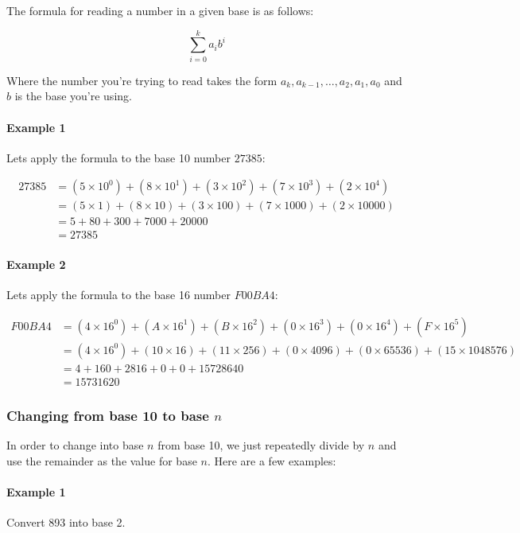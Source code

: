 \documentclass{article}
\begin{document}
The formula for reading a number in a given base is as follows:

\[
	\sum_{i=0}^{k}a_{i}b^{i}
\]

Where the number you're trying to read takes the form $a_k, a_{k-1}, \ldots, a_2, a_1, a_0$ and $b$ is the base you're using.

\paragraph{Example 1}

Lets apply the formula to the base 10 number $27385$:

\[
	\begin{split}
		27385 &= (5 \times 10^0) + (8 \times 10^1) + (3 \times 10^2) + (7 \times 10^3) + (2 \times 10^4)\\
		      &= (5 \times 1) + (8 \times 10) + (3 \times 100) + (7 \times 1000) + (2 \times 10000)\\
		      &= 5 + 80 + 300 + 7000 + 20000\\
		      &= 27385
	\end{split}
\]

\paragraph{Example 2}

Lets apply the formula to the base 16 number $F00BA4$:

\[
	\begin{split}
		F00BA4 &= (4 \times 16^0) + (A \times 16^1) + (B \times 16^2) + (0 \times 16^3) + (0 \times 16^4) + (F \times 16^5)\\
		       &= (4 \times 16^0) + (10 \times 16) + (11 \times 256) + (0 \times 4096) + (0 \times 65536) + (15 \times 1048576)\\
		       &= 4 + 160 + 2816 + 0 + 0 + 15728640\\
		       &= 15731620
	\end{split}
\]

\subsubsection{Changing from base 10 to base $n$}

In order to change into base $n$ from base 10, we just repeatedly divide by $n$ and use the remainder as the value for base $n$. Here are a few examples:

\paragraph{Example 1}
Convert 893 into base 2.
\end{document}
